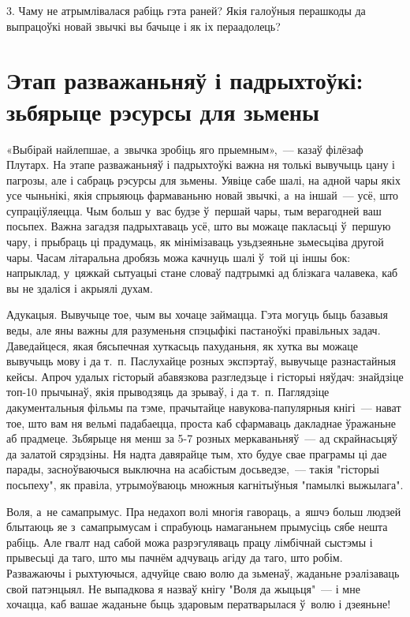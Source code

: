 3. Чаму не атрымлівалася рабіць гэта раней? Якія галоўныя перашкоды да выпрацоўкі новай звычкі вы бачыце і як іх пераадолець?


\section{Этап разважаньняў і падрыхтоўкі: зьбярыце рэсурсы для зьмены}

«Выбірай найлепшае, а~звычка зробіць яго прыемным»,~--- казаў філёзаф Плутарх. На этапе разважаньняў і падрыхтоўкі важна ня толькі вывучыць цану і пагрозы, але і сабраць рэсурсы для зьмены. Уявіце сабе шалі, на адной чары якіх усе чыньнікі, якія спрыяюць фармаваньню новай звычкі, а~на іншай~--- усё, што супраціўляецца. Чым больш у~вас будзе ў~першай чары, тым верагодней ваш посьпех. Важна загадзя падрыхтаваць усё, што вы можаце пакласьці ў~першую чару, і прыбраць ці прадумаць, як мінімізаваць узьдзеяньне зьмесьціва другой чары. Часам літаральна дробязь можа качнуць шалі ў~той ці іншы бок: напрыклад, у~цяжкай сытуацыі стане словаў падтрымкі ад блізкага чалавека, каб вы не здаліся і акрыялі духам.

Адукацыя. Вывучыце тое, чым вы хочаце займацца. Гэта могуць быць базавыя веды, але яны важны для разуменьня спэцыфікі пастаноўкі правільных задач. Даведайцеся, якая бясьпечная хуткасьць пахуданьня, як хутка вы можаце вывучыць мову і да т.~п. Паслухайце розных экспэртаў, вывучыце разнастайныя кейсы. Апроч удалых гісторый абавязкова разгледзьце і гісторыі няўдач: знайдзіце топ-10 прычынаў, якія прыводзяць да зрываў, і да т.~п. Паглядзіце дакументальныя фільмы па тэме, прачытайце навукова-папулярныя кнігі~--- нават тое, што вам ня вельмі падабаецца, проста каб сфармаваць дакладнае ўражаньне аб прадмеце. Зьбярыце ня менш за 5-7 розных меркаваньняў~--- ад скрайнасьцяў да залатой сярэдзіны. Ня надта давярайце тым, хто будуе свае праграмы ці дае парады, засноўваючыся выключна на асабістым досьведзе,~--- такія "гісторыі посьпеху", як правіла, утрымоўваюць множныя кагнітыўныя "памылкі выжылага".

Воля, а~не самапрымус. Пра недахоп волі многія гавораць, а~яшчэ больш людзей блытаюць яе з~самапрымусам і спрабуюць намаганьнем прымусіць сябе нешта рабіць. Але гвалт над сабой можа разрэгуляваць працу лімбічнай сыстэмы і прывесьці да таго, што мы пачнём адчуваць агіду да таго, што робім. Разважаючы і рыхтуючыся, адчуйце сваю волю да зьменаў, жаданьне рэалізаваць свой патэнцыял. Не выпадкова я назваў кнігу "Воля да жыцьця"~--- і мне хочацца, каб вашае жаданьне быць здаровым ператварылася ў~волю і дзеяньне!


